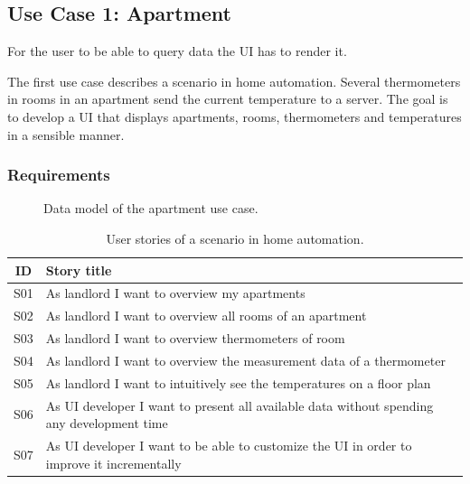 \subsection{Use Case 1: Apartment}\label{sec:usecase1}
For the user to be able to query data the UI has to render it.

The first use case describes a scenario in home automation. Several thermometers in rooms in an apartment send the current temperature to a server. The goal is to develop a UI that displays apartments, rooms, thermometers and temperatures in a sensible manner.

\subsubsection{Requirements}

\begin{figure}[!htb]
  \caption{Data model of the apartment use case.}
\end{figure}

\begin{table}
  \begin{center}
    \begin{tabular}{ |c|l| }
      \hline
      ID & Story title \\
      \hline
      S01 & As landlord I want to overview my apartments \\
      S02 & As landlord I want to overview all rooms of an apartment \\
      S03 & As landlord I want to overview thermometers of room \\
      S04 & As landlord I want to overview the measurement data of a thermometer \\
      S05 & As landlord I want to intuitively see the temperatures on a floor plan \\
      S06 & As UI developer I want to present all available data without spending any development time \\
      S07 & As UI developer I want to be able to customize the UI in order to improve it incrementally \\
      \hline
    \end{tabular}
    \caption{User stories of a scenario in home automation.}
    \label{tab:usecase1}
  \end{center}
\end{table}

